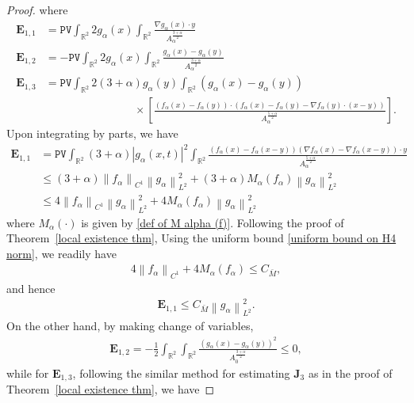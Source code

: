 \documentclass[10pt,a4paper]{amsart}
\newcommand{\PV}{\texttt{PV}}
\newcommand{\R}{\mathbb R}
\begin{document}
\begin{proof}
where
\begin{align*}
\mathbf{E}_{1,1}&=\PV\int_{\mathbb{R}^{2}} 2g_{\alpha}(x) \int_{\mathbb{R}^{2}} \frac{\nabla g_{\alpha}(x) \cdot y}{A_{\alpha}^{\frac{3+\alpha}{ 2}} }\\
\mathbf{E}_{1,2}&=-\PV\int_{\mathbb{R}^{2}} 2g_{\alpha}(x) \int_{\mathbb{R}^{2}} \frac{g_{\alpha}(x)-g_{\alpha}(y)}{A_{\alpha}^{\frac{3+\alpha}{2}}} \\
\mathbf{E}_{1,3}&=\PV\int_{\mathbb{R}^{2}} 2(3+\alpha)g_{\alpha}(y) \int_{\mathbb{R}^{2}} (g_{\alpha}(x)-g_{\alpha}(y))\\
&\qquad\qquad\qquad\qquad\times\left[\frac{\left(f_{\alpha}(x)-f_{\alpha}(y)\right) \cdot\left(f_{\alpha}(x)-f_{\alpha}(y)-\nabla f_{\alpha}(y) \cdot(x-y)\right)}{A_{\alpha}^{\frac{5+\alpha}{2}}}\right]. 
\end{align*}
Upon integrating by parts, we have
\begin{align*}
\mathbf{E}_{1,1}&=\PV \int_{\mathbb{R}^{2}} (3+\alpha)|g_{\alpha}(x, t)|^{2}\int_{\mathbb{R}^{2}}\frac{\left(f_{\alpha}(x)-f_{\alpha}(x-y)\right)\left(\nabla f_{\alpha}(x)-\nabla f_{\alpha}(x-y)\right) \cdot y}{A_{\alpha}^{\frac{5+\alpha}{ 2}} }\\
&\le (3+\alpha)\left\|f_{\alpha}\right\|_{ C^{1}}\left\|g_{\alpha}\right\|_{L^{2}}^{2}+(3+\alpha) M_{\alpha}\left(f_{\alpha}\right)\left\|g_{\alpha}\right\|_{L^{2}}^{2}\\
&\le 4\left\|f_{\alpha}\right\|_{ C^{1}}\left\|g_{\alpha}\right\|_{L^{2}}^{2} + 4M_{\alpha}\left(f_{\alpha}\right)\left\|g_{\alpha}\right\|_{L^{2}}^{2}
\end{align*}
where $M_\alpha(\cdot)$ is given by \eqref{def of M alpha (f)}. Following the proof of Theorem~\ref{local existence thm}, Using the uniform bound \eqref{uniform bound on H4 norm}, we readily have
\begin{align*}
4\left\|f_{\alpha}\right\|_{ C^{1}}+4M_{\alpha}(f_{\alpha})\le C_{\bar{M}},
\end{align*}
and hence
\begin{align*}
\mathbf{E}_{1,1}\le C_{\bar{M}}\left\|g_{\alpha}\right\|_{L^{2}}^{2}.
\end{align*}
On the other hand, by making change of variables,
\begin{align*}
\mathbf{E}_{1,2}=-\frac{1}{2}\int_{\R^2}\int_{\R^2}\frac{(g_\alpha(x)-g_\alpha(y))^2}{A_{0}^\frac{3+\alpha}{2}}\le 0,
\end{align*}
while for $\mathbf{E}_{1,3}$, following the similar method for estimating $\mathbf{J}_3$ as in the proof of Theorem~\ref{local existence thm}, we have

\end{proof}
\end{document}

